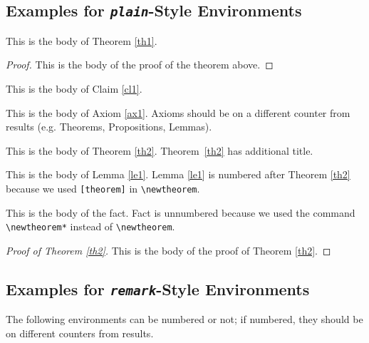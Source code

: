 \documentclass[rbe,wwwview]{econbr}
\begin{document}
\subsection{Examples for \emph{\texttt{plain}}-Style Environments}

\begin{theorem}\label{th1}
This is the body of Theorem \ref{th1}.
\end{theorem}

\begin{proof}
This is the body of the proof of the theorem above.
\end{proof}

\begin{claim}\label{cl1}
This is the body of Claim \ref{cl1}. 
\end{claim}

\begin{axiom}\label{ax1}
This is the body of Axiom \ref{ax1}. Axioms should be on a different counter from results (e.g. Theorems, Propositions, Lemmas).
\end{axiom}

\begin{theorem}\label{th2}
This is the body of Theorem \ref{th2}. Theorem~\ref{th2} has additional title.
\end{theorem}

\begin{lemma}\label{le1}
This is the body of Lemma \ref{le1}. Lemma \ref{le1} is numbered after Theorem \ref{th2} because we used \verb|[theorem]| in \verb|\newtheorem|.
\end{lemma}

\begin{fact}
This is the body of the fact. Fact is unnumbered because we used the command \verb|\newtheorem*| instead of \verb|\newtheorem|.
\end{fact}

\begin{proof}[Proof of Theorem \ref{th2}]
This is the body of the proof of Theorem \ref{th2}.
\end{proof}

\subsection{Examples for \emph{\texttt{remark}}-Style Environments}

The following environments can be numbered or not; if numbered, they should be on different counters from results.
\end{document}

